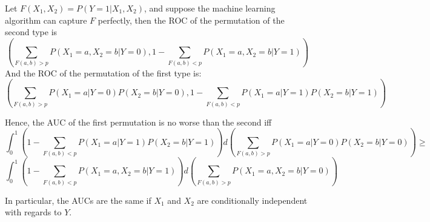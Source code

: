 \documentclass[]{article}
\begin{document}
Let $F(X_1,X_2)=P(Y=1|X_1,X_2)$, and suppose the machine learning algorithm can capture $F$ perfectly,
then the ROC of the permutation of the second type is
$$\left(\sum_{F(a,b)>p}P(X_1=a,X_2=b|Y=0),1-\sum_{F(a,b)<p}P(X_1=a,X_2=b|Y=1)\right)$$
And the ROC of the permutation of the first type is:
$$\left(\sum_{F(a,b)>p}P(X_1=a|Y=0)P(X_2=b|Y=0),1-\sum_{F(a,b)<p}P(X_1=a|Y=1)P(X_2=b|Y=1)\right)$$

Hence, the AUC of the first permutation is no worse than the second iff
$$\int_0^1 \left(1-\sum_{F(a,b)<p}P(X_1=a|Y=1)P(X_2=b|Y=1)\right) d\left(\sum_{F(a,b)>p}P(X_1=a|Y=0)P(X_2=b|Y=0)\right)\geq$$
$$ \int_0^1\left(1-\sum_{F(a,b)<p}P(X_1=a,X_2=b|Y=1)\right) d\left(\sum_{F(a,b)>p}P(X_1=a,X_2=b|Y=0)\right) $$

In particular, the AUCs are the same if $X_1$ and $X_2$ are conditionally independent with regards to $Y$.



	
\end{document}
